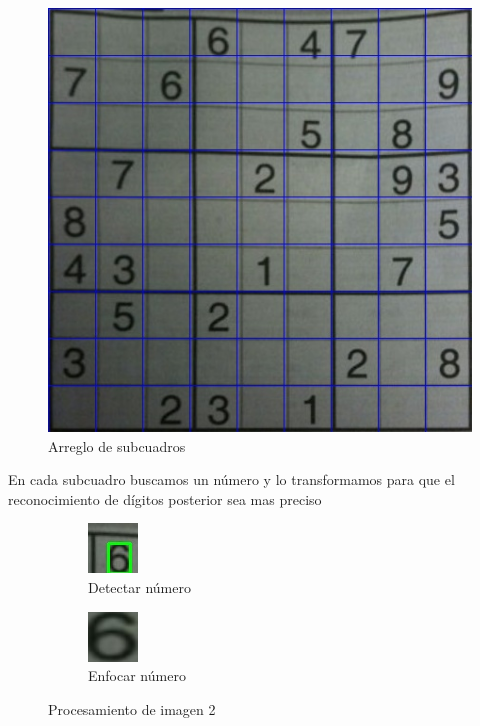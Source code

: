 \documentclass{article}
\begin{document}
\begin{figure}[H]
\caption{Arreglo de subcuadros}
\centering
\includegraphics[width=.5\textwidth]{squares}
\end{figure}
\vspace{.5cm}
En cada subcuadro buscamos un número y lo transformamos para que el reconocimiento
de dígitos posterior sea mas preciso
\vspace{.5cm}
\begin{figure}[H]
\centering
\begin{subfigure}{.5\textwidth}
  \centering
  \includegraphics[width=.3\linewidth]{square_contour}
  \caption{Detectar número}
  \label{fig:sub1}
\end{subfigure}%
\begin{subfigure}{.5\textwidth}
  \centering
  \includegraphics[width=.3\linewidth]{square_contour_zoom}
  \caption{Enfocar número}
  \label{fig:sub2}
\end{subfigure}
\caption{Procesamiento de imagen 2}
\label{fig:test}
\end{figure}
\vspace{.5cm}
\end{document}
